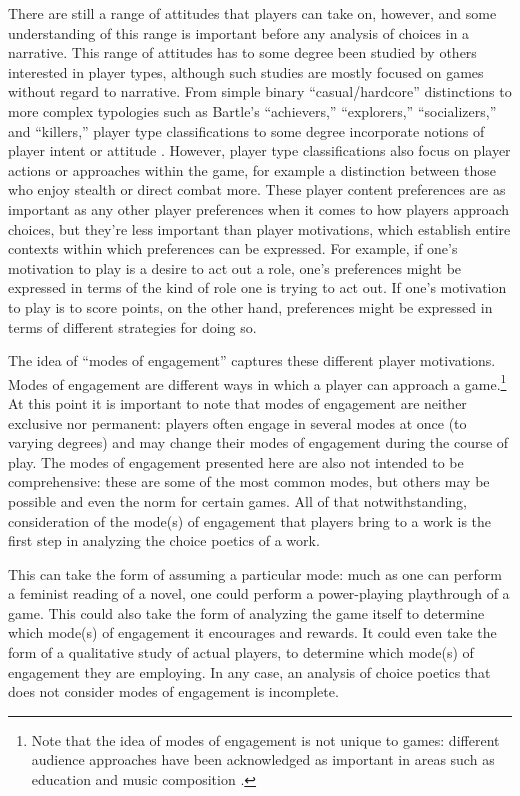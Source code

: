 There are still a range of attitudes that players can take on, however, and some understanding of this range is important before any analysis of choices in a narrative.
%
This range of attitudes has to some degree been studied by others interested in player types, although such studies are mostly focused on games without regard to narrative.
%
From simple binary ``casual/hardcore'' distinctions to more complex typologies such as Bartle's ``achievers,'' ``explorers,'' ``socializers,'' and ``killers,'' player type classifications to some degree incorporate notions of player intent or attitude \citep{Bartle1996}.
%
However, player type classifications also focus on player actions or approaches within the game, for example a distinction between those who enjoy stealth or direct combat more.
%
These player content preferences are as important as any other player preferences when it comes to how players approach choices, but they're less important than player motivations, which establish entire contexts within which preferences can be expressed.
%
For example, if one's motivation to play is a desire to act out a role, one's preferences might be expressed in terms of the kind of role one is trying to act out.
%
If one's motivation to play is to score points, on the other hand, preferences might be expressed in terms of different strategies for doing so.


The idea of ``modes of engagement'' captures these different player motivations.
%
Modes of engagement are different ways in which a player can approach a game.\footnote{%
Note that the idea of modes of engagement is not unique to games: different audience approaches have been acknowledged as important in areas such as education and music composition \citep{Langer1995,Brown2001}.}
%
At this point it is important to note that modes of engagement are neither exclusive nor permanent: players often engage in several modes at once (to varying degrees) and may change their modes of engagement during the course of play.
%
The modes of engagement presented here are also not intended to be comprehensive: these are some of the most common modes, but others may be possible and even the norm for certain games.
%
All of that notwithstanding, consideration of the mode(s) of engagement that players bring to a work is the first step in analyzing the choice poetics of a work.


This can take the form of assuming a particular mode: much as one can perform a feminist reading of a novel, one could perform a power-playing playthrough of a game.
%
This could also take the form of analyzing the game itself to determine which mode(s) of engagement it encourages and rewards.
%
It could even take the form of a qualitative study of actual players, to determine which mode(s) of engagement they are employing.
%
In any case, an analysis of choice poetics that does not consider modes of engagement is incomplete.


